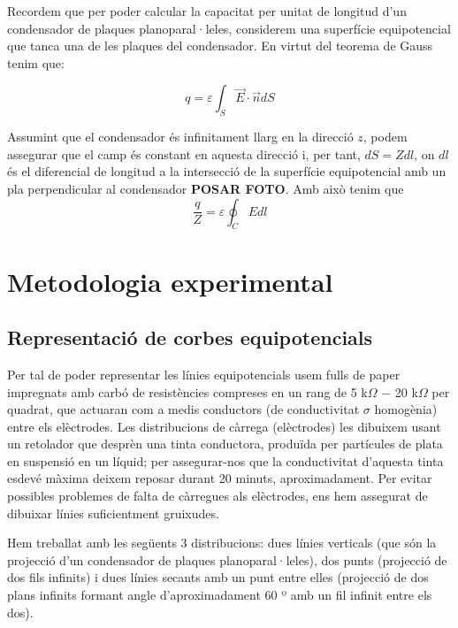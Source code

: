 \documentclass[a4paper,10.5pt]{report}
\begin{document}
	Recordem que per poder calcular la capacitat per unitat de longitud d'un condensador de plaques planoparal·leles, considerem una superfície equipotencial que tanca una de les plaques del condensador. En virtut del teorema de Gauss tenim que:
	
	\begin{equation}
		q = \varepsilon \int_S \vec{E}\cdot \vec{n}dS
	\end{equation}
	
	Assumint que el condensador és infinitament llarg en la direcció $z$, podem assegurar que el camp és constant en aquesta direcció i, per tant, $dS = Zdl$, on $dl$ és el diferencial de longitud a la intersecció de la superfície equipotencial amb un pla perpendicular al condensador \textbf{POSAR FOTO}. Amb això tenim que
	\begin{equation}
		\frac{q}{Z} = \varepsilon \oint_C E dl \label{eq1.13}
	\end{equation}
	
	\section{Metodologia experimental}
	\subsection{Representació de corbes equipotencials}
	Per tal de poder representar les línies equipotencials usem fulls de paper impregnats amb carbó de resistències compreses en un rang de 5 k$\Omega$ $-$ 20 k$\Omega$ per quadrat, que actuaran com a medis conductors (de conductivitat $\sigma$ homogènia) entre els elèctrodes. Les distribucions de càrrega (elèctrodes) les dibuixem usant un retolador que desprèn una tinta conductora, produïda per partícules de plata en suspensió en un líquid; per assegurar-nos que la conductivitat d'aquesta tinta esdevé màxima deixem reposar durant 20 minuts, aproximadament. Per evitar possibles problemes de falta de càrregues als elèctrodes, ens hem assegurat de dibuixar línies suficientment gruixudes.
	
	Hem treballat amb les següents 3 distribucions: dues línies verticals (que són la projecció d'un condensador de plaques planoparal·leles), dos punts (projecció de dos fils infinits) i dues línies secants amb un punt entre elles (projecció de dos plans infinits formant angle d'aproximadament 60 º amb un fil infinit entre els dos).
	
\end{document}
